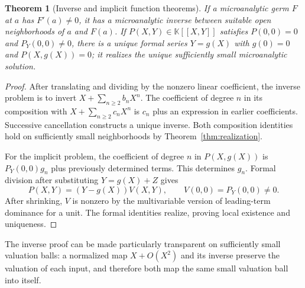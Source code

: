 \documentclass[11pt,oneside]{article}
\newtheorem{theorem}{Theorem}[section]
\theoremstyle{definition}\newtheorem{definition}[theorem]{Definition}
\newcommand{\K}{\mathbb K}
\begin{document}
\begin{theorem}[Inverse and implicit function theorems]\label{thm:inverse}
If a microanalytic germ $F$ at $a$ has $F'(a)\ne0$, it has a microanalytic inverse between suitable open neighborhoods of $a$ and $F(a)$.
If $P(X,Y)\in\K[[X,Y]]$ satisfies $P(0,0)=0$ and $P_Y(0,0)\ne0$, there is a unique formal series $Y=g(X)$ with $g(0)=0$ and $P(X,g(X))=0$; it realizes the unique sufficiently small microanalytic solution.
\end{theorem}
\begin{proof}
After translating and dividing by the nonzero linear coefficient, the inverse problem is to invert $X+\sum_{n\geq2}b_nX^n$. The coefficient of degree $n$ in its composition with $X+\sum_{n\geq2}c_nX^n$ is $c_n$ plus an expression in earlier coefficients. Successive cancellation constructs a unique inverse. Both composition identities hold on sufficiently small neighborhoods by Theorem~\ref{thm:realization}.

For the implicit problem, the coefficient of degree $n$ in $P(X,g(X))$ is $P_Y(0,0)g_n$ plus previously determined terms. This determines $g_n$. Formal division after substituting $Y=g(X)+Z$ gives
\[
 P(X,Y)=(Y-g(X))V(X,Y),\qquad V(0,0)=P_Y(0,0)\ne0.
\]
After shrinking, $V$ is nonzero by the multivariable version of leading-term dominance for a unit. The formal identities realize, proving local existence and uniqueness.
\end{proof}
The inverse proof can be made particularly transparent on sufficiently small valuation balls: a normalized map $X+O(X^2)$ and its inverse preserve the valuation of each input, and therefore both map the same small valuation ball into itself.
\end{document}
